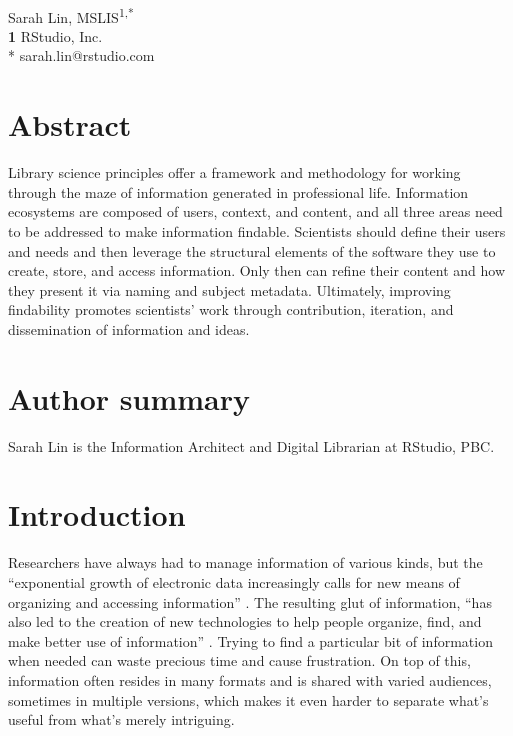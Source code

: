 \documentclass[10pt,letterpaper]{article}
\begin{document}
\vspace*{0.2in}

\begin{flushleft}
{\Large
\textbf{}
}
\newline
\\
{Sarah Lin, MSLIS}\textsuperscript{1,*}
\\
\textbf{1} RStudio, Inc.
\\
\bigskip
* sarah.lin@rstudio.com
\end{flushleft}

\section*{Abstract}

Library science principles offer a framework and methodology for working through
the maze of information generated in professional life.  Information ecosystems
are composed of users, context, and content, and all three areas need to be
addressed to make information findable.  Scientists should define their users
and needs and then leverage the structural elements of the software they use to
create, store, and access information.  Only then can refine their content and
how they present it via naming and subject metadata.  Ultimately, improving
findability promotes scientists' work through contribution, iteration, and
dissemination of information and ideas.

\section*{Author summary}

Sarah Lin is the Information Architect and Digital Librarian at RStudio, PBC.

\section*{Introduction}

Researchers have always had to manage information of various kinds, but the
``exponential growth of electronic data increasingly calls for new means of
organizing and accessing information'' \cite{Hedden2016}. The resulting glut of
information, ``has also led to the creation of new technologies to help people
organize, find, and make better use of information''
\cite{Rosenfeld2015}. Trying to find a particular bit of information when needed
can waste precious time and cause frustration. On top of this, information often
resides in many formats and is shared with varied audiences, sometimes in
multiple versions, which makes it even harder to separate what's useful from
what's merely intriguing.
\end{document}
